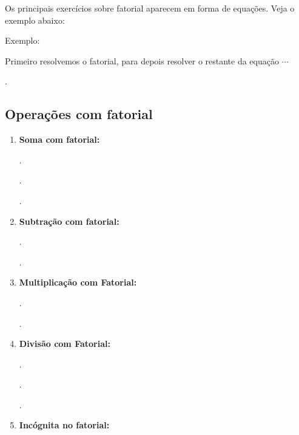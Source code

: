 \begin{multicols*}{2}
Os principais exercícios sobre fatorial aparecem em forma de equações. Veja o exemplo abaixo:

Exemplo: 

Primeiro resolvemos o fatorial, para depois resolver o restante da equação $\cdots $



.

\subsection{Operações com fatorial}

		\begin{enumerate}

		\item \textbf{Soma com fatorial:}
		
		.
		
		.
		
		.
		
		\item \textbf{Subtração com fatorial:}
		
		.
		
		.
		
		
		\item \textbf{Multiplicação com Fatorial:}
		
		.
		
		.
		
		\item \textbf{Divisão com Fatorial:}
		
		.
		
		.
		
		.

		\item \textbf{Incógnita no fatorial:}
		

\end{enumerate}
\end{multicols*}
